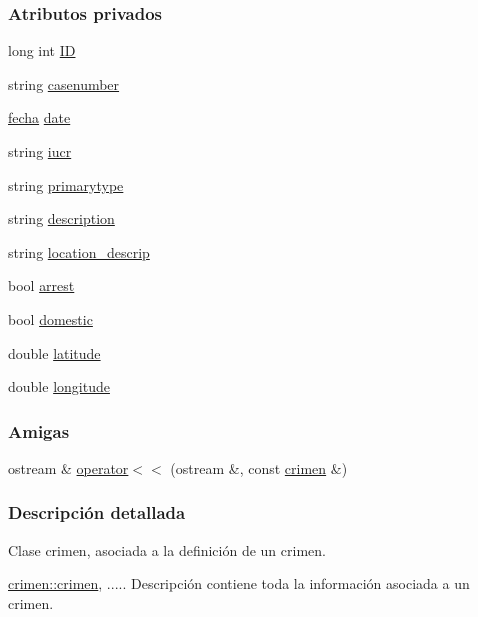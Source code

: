 \subsubsection*{Atributos privados}
\begin{DoxyCompactItemize}
\item 
long int \hyperlink{classcrimen_a59702f88f0b0c25781ae3d296790dcb8}{I\+D}
\item 
string \hyperlink{classcrimen_ad388e966532011945fcdb69cb29b74ff}{casenumber}
\item 
\hyperlink{classfecha}{fecha} \hyperlink{classcrimen_ab3ef462c5da98dbf03142c06e8c1a099}{date}
\item 
string \hyperlink{classcrimen_a5699c8bd36d3cad23cff70cbd984f616}{iucr}
\item 
string \hyperlink{classcrimen_a6d23454b3b810d0d9ff3245ab6bfbfbe}{primarytype}
\item 
string \hyperlink{classcrimen_aad80606e3a0a9ec03c2d2d082900055b}{description}
\item 
string \hyperlink{classcrimen_a707cfdaffc34589df0689e8f86b67765}{location\+\_\+descrip}
\item 
bool \hyperlink{classcrimen_aaca016db0de1f4fca947dff8f5b57eb6}{arrest}
\item 
bool \hyperlink{classcrimen_ab4112133af2623da7a272e73845348db}{domestic}
\item 
double \hyperlink{classcrimen_a1ecd1bcebba3566f13a469ec82f647a0}{latitude}
\item 
double \hyperlink{classcrimen_ac140577426c2a38d58ec1907bce53492}{longitude}
\end{DoxyCompactItemize}
\subsubsection*{Amigas}
\begin{DoxyCompactItemize}
\item 
ostream \& \hyperlink{classcrimen_a70d7dbf132d06cb3c889042765a7da2e}{operator$<$$<$} (ostream \&, const \hyperlink{classcrimen}{crimen} \&)
\end{DoxyCompactItemize}


\subsubsection{Descripción detallada}
Clase crimen, asociada a la definición de un crimen. 

\hyperlink{classcrimen_ab1147e36869c7e635699e4ef746a7555}{crimen\+::crimen}, ..... Descripción contiene toda la información asociada a un crimen.

